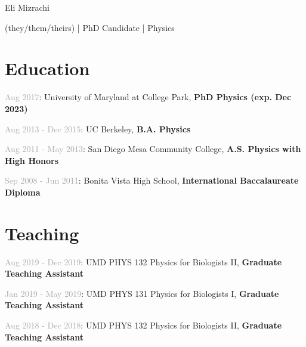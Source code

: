 \documentclass[
  10pt,
  letterpaper,
  DIV=11,
  numbers=noendperiod]{scrartcl}
\author{}
\date{}
\begin{document}
\ifdefined\Shaded\renewenvironment{Shaded}{\begin{tcolorbox}[breakable, frame hidden, enhanced, borderline west={3pt}{0pt}{shadecolor}, interior hidden, boxrule=0pt, sharp corners]}{\end{tcolorbox}}\fi

\begin{center}

\begin{LARGE}Eli Mizrachi\end{LARGE}

\begin{small}(they/them/theirs) | PhD Candidate | Physics\end{small}

\href{mailto:emiz@umd.edu}{}
\href{https://e-miz.github.io}{}

\end{center}

\hypertarget{fa-user-graduate-education}{%
\section{\texorpdfstring{
Education}{ Education}}\label{fa-user-graduate-education}}

\textcolor{darkgray}{Aug 2017}: University of Maryland at College Park,
\textbf{PhD Physics (exp. Dec 2023)}

\textcolor{darkgray}{Aug 2013 - Dec 2015}: UC Berkeley, \textbf{B.A.
Physics}

\textcolor{darkgray}{Aug 2011 - May 2013}: San Diego Mesa Community
College, \textbf{A.S. Physics with High Honors}

\textcolor{darkgray}{Sep 2008 - Jun 2011}: Bonita Vista High School,
\textbf{International Baccalaureate Diploma}

\hypertarget{fa-school-teaching}{%
\section{\texorpdfstring{
Teaching}{ Teaching}}\label{fa-school-teaching}}

\textcolor{darkgray}{Aug 2019 - Dec 2019}: UMD PHYS 132 Physics for
Biologists II, \textbf{Graduate Teaching Assistant}

\textcolor{darkgray}{Jan 2019 - May 2019}: UMD PHYS 131 Physics for
Biologists I, \textbf{Graduate Teaching Assistant}

\textcolor{darkgray}{Aug 2018 - Dec 2018}: UMD PHYS 132 Physics for
Biologists II, \textbf{Graduate Teaching Assistant}
\end{document}
